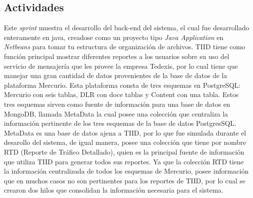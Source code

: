 \subsection{Actividades}
\indent Este \textit{sprint} muestra el desarrollo del back-end del sistema, el cual fue desarrollado enteramente en java, creadose como un proyecto tipo \textit{Java Application} en \textit{Netbeans} para tomar tu estructura de organización de archivos.
\newline
\newline
\indent TIID tiene como función principal mostrar diferentes reportes a los usuarios sobre su uso del servicio de mensajería que les provee la empresa Tedexis, por lo cual tiene que manejar una gran cantidad de datos provenientes de la base de datos de la plataforma Mercurio. Esta plataforma consta de tres esquemas en PostgreSQL: Mercurio con seis tablas, DLR con doce tablas y Content con una tabla. Estos tres esquemas sirven como fuente de información para una base de datos en MongoDB, llamada MetaData la cual posee una colección que centraliza la información pertinente de los tres esquemas de la base de datos PostgresSQL. MetaData es una base de datos ajena a TIID, por lo que fue simulada durante el desarollo del sistema, de igual manera, posee una colección que tiene por nombre RTD (Reporte de Tráfico Detallado), quien es la principal fuente de información que utiliza TIID para generar todos sus reportes.
\newline
\newline
\indent Ya que la colección RTD tiene la información centralizada de todos los esquemas de Mercurio, posee información que en muchos casos no son pertinentes para los reportes de TIID, por lo cual se crearon dos hilos que consolidan la información necesaria para el sistema. 

